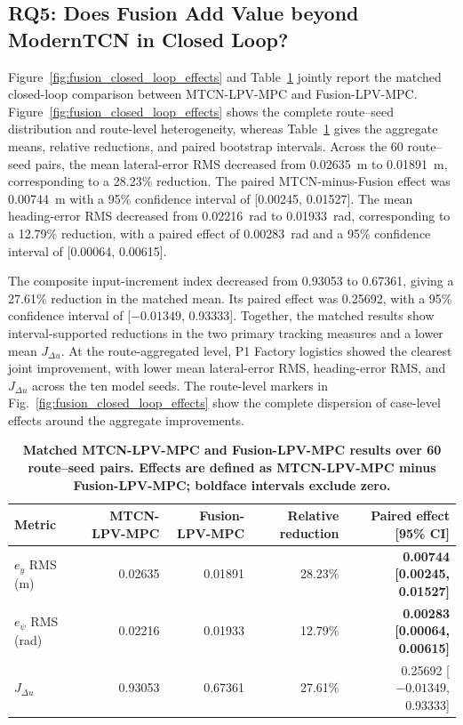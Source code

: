 \documentclass{ieeeaccess}
\begin{document}
\subsection{RQ5: Does Fusion Add Value beyond ModernTCN in Closed Loop?}

Figure~\ref{fig:fusion_closed_loop_effects} and Table~\ref{tab:five_source_closed_loop}
jointly report the matched closed-loop comparison between MTCN-LPV-MPC and
Fusion-LPV-MPC. Figure~\ref{fig:fusion_closed_loop_effects} shows the complete
route--seed distribution and route-level heterogeneity, whereas
Table~\ref{tab:five_source_closed_loop} gives the aggregate means, relative
reductions, and paired bootstrap intervals. Across the 60 route--seed
pairs, the mean lateral-error RMS decreased from 0.02635~m to 0.01891~m,
corresponding to a 28.23\% reduction. The paired MTCN-minus-Fusion effect was
0.00744~m with a 95\% confidence interval of [0.00245, 0.01527]. The mean
heading-error RMS decreased from 0.02216~rad to 0.01933~rad, corresponding to
a 12.79\% reduction, with a paired effect of 0.00283~rad and a 95\% confidence
interval of [0.00064, 0.00615].

The composite input-increment index decreased from 0.93053 to 0.67361, giving
a 27.61\% reduction in the matched mean. Its paired effect was 0.25692, with a
95\% confidence interval of [$-0.01349$, 0.93333]. Together, the matched results
show interval-supported reductions in the two primary tracking measures and a
lower mean $J_{\Delta u}$. At the route-aggregated level, P1 Factory logistics
showed the clearest joint improvement, with lower mean lateral-error RMS,
heading-error RMS, and $J_{\Delta u}$ across the ten model seeds. The
route-level markers in Fig.~\ref{fig:fusion_closed_loop_effects} show the
complete dispersion of case-level effects around the aggregate improvements.

\begin{table}[!t]
\centering
\caption{\textbf{Matched MTCN-LPV-MPC and Fusion-LPV-MPC results over 60 route--seed pairs. Effects are defined as MTCN-LPV-MPC minus Fusion-LPV-MPC; boldface intervals exclude zero.}}
\label{tab:five_source_closed_loop}
\scriptsize
\setlength{\tabcolsep}{4pt}
\begin{tabular}{|l|r|r|r|r|}
\hline
Metric & MTCN-LPV-MPC & Fusion-LPV-MPC & Relative reduction & Paired effect [95\% CI] \\
\hline
$e_y$ RMS (m)
& 0.02635 & 0.01891 & 28.23\%
& \textbf{0.00744 [0.00245, 0.01527]} \\
$e_\psi$ RMS (rad)
& 0.02216 & 0.01933 & 12.79\%
& \textbf{0.00283 [0.00064, 0.00615]} \\
$J_{\Delta u}$
& 0.93053 & 0.67361 & 27.61\%
& 0.25692 [$-0.01349$, 0.93333] \\
\hline
\end{tabular}
\end{table}
\end{document}
